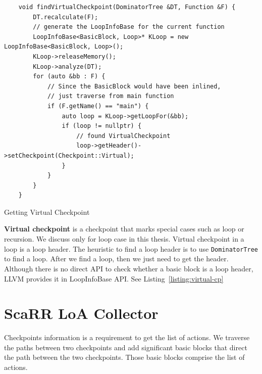 \begin{listing}[ht!]
    \begin{verbatim}
    void findVirtualCheckpoint(DominatorTree &DT, Function &F) {
        DT.recalculate(F);
        // generate the LoopInfoBase for the current function
        LoopInfoBase<BasicBlock, Loop>* KLoop = new LoopInfoBase<BasicBlock, Loop>();
        KLoop->releaseMemory();
        KLoop->analyze(DT);
        for (auto &bb : F) {
            // Since the BasicBlock would have been inlined, 
            // just traverse from main function
            if (F.getName() == "main") {
                auto loop = KLoop->getLoopFor(&bb);
                if (loop != nullptr) {
                    // found VirtualCheckpoint
                    loop->getHeader()->setCheckpoint(Checkpoint::Virtual);
                }
            }
        }
    }
    \end{verbatim}
    \caption{Getting Virtual Checkpoint}
    \label{listing:virtual-cp}
\end{listing}
\vspace{20cm}


\vspace{0.5cm}
\noindent \textbf{Virtual checkpoint} is a checkpoint that marks special cases
such as loop or recursion. We discuss only for loop case in this thesis.
Virtual checkpoint in a loop is a loop header. The heuristic to find a loop
header is to use \texttt{DominatorTree} to find a loop. After we find a loop,
then we just need to get the header. Although there is no direct API to check
whether a basic block is a loop header, LLVM provides it in LoopInfoBase API.
See Listing~\ref{listing:virtual-cp}



\section{ScaRR LoA Collector}
\label{sec:scarr-loa-collector}

Checkpoints information is a requirement to get the list of actions.  We
traverse the paths between two checkpoints and add significant basic blocks that
direct the path between the two checkpoints. Those basic blocks comprise the
list of actions. 

